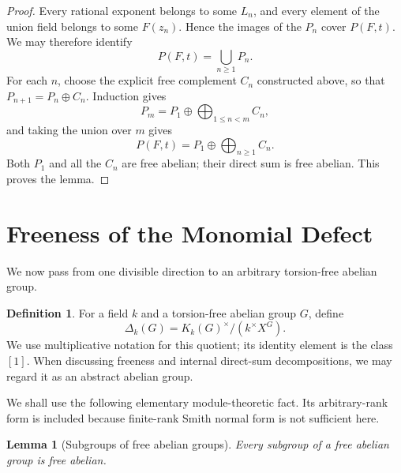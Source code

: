 \documentclass[11pt,a4paper]{article}
\numberwithin{equation}{section}
\theoremstyle{plain}
\newtheorem{lemma}[theorem]{Lemma}
\theoremstyle{definition}
\newtheorem{definition}[theorem]{Definition}
\theoremstyle{remark}
\newcommand{\Kk}[1]{K_k(#1)}
\newcommand{\Dk}[1]{\Delta_k(#1)}
\begin{document}
\begin{proof}
Every rational exponent belongs to some $L_n$, and every element of the
union field belongs to some $F(z_n)$.  Hence the images of the $P_n$ cover
$P(F,t)$.  We may therefore identify
\[
  P(F,t)=\bigcup_{n\geq1}P_n.
\]
For each $n$, choose the explicit free complement $C_n$ constructed above,
so that $P_{n+1}=P_n\oplus C_n$.  Induction gives
\[
  P_m=P_1\oplus\bigoplus_{1\leq n<m}C_n,
\]
and taking the union over $m$ gives
\[
  P(F,t)=P_1\oplus\bigoplus_{n\geq1}C_n.
\]
Both $P_1$ and all the $C_n$ are free abelian; their direct sum is free
abelian.  This proves the lemma.
\end{proof}

\section{Freeness of the Monomial Defect}\label{sec:defect}

We now pass from one divisible direction to an arbitrary torsion-free
abelian group.

\begin{definition}
For a field $k$ and a torsion-free abelian group $G$, define
\[
  \Dk G=\Kk G^\times/(k^\times X^G).
\]
We use multiplicative notation for this quotient; its identity element is
the class $[1]$.  When discussing freeness and internal direct-sum
decompositions, we may regard it as an abstract abelian group.
\end{definition}

We shall use the following elementary module-theoretic fact.  Its
arbitrary-rank form is included because finite-rank Smith normal form is not
sufficient here.

\begin{lemma}[Subgroups of free abelian groups]\label{lem:subgroup-free}
Every subgroup of a free abelian group is free abelian.
\end{lemma}
\end{document}
